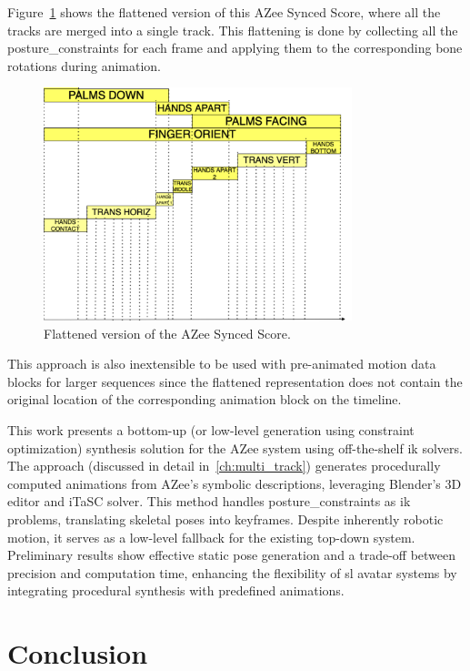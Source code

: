 \documentclass[../../main.tex]{subfiles}
\begin{document}
Figure~\ref{fig:azee_flattened_score} shows the flattened version of this AZee Synced Score, where all the tracks are merged into a single track. This flattening is done by collecting all the \gls{posture_constraint}s for each frame and applying them to the corresponding bone rotations during animation.

\begin{figure}[h]
    \centering
    \includegraphics[width=0.8\textwidth]{chapters/multi_track/images/azee_flattened_score.png}
    \caption{Flattened version of the AZee Synced Score.}
    \label{fig:azee_flattened_score}
\end{figure}

This approach is also inextensible to be used with pre-animated motion data blocks for larger sequences since the flattened representation does not contain the original location of the corresponding animation block on the timeline. 

This work presents a bottom-up (or low-level generation using constraint optimization) synthesis solution for the AZee system using off-the-shelf \gls{ik} solvers. The approach (discussed in detail in~\ref{ch:multi_track}) generates procedurally computed animations from AZee's symbolic descriptions, leveraging Blender's 3D editor and iTaSC solver. This method handles \gls{posture_constraint}s as \gls{ik} problems, translating skeletal poses into keyframes. Despite inherently robotic motion, it serves as a low-level fallback for the existing top-down system. Preliminary results show effective static pose generation and a trade-off between precision and computation time, enhancing the flexibility of \gls{sl} avatar systems by integrating procedural synthesis with predefined animations.

\section{Conclusion}
\label{ch:background_work:conclusion}
\end{document}
